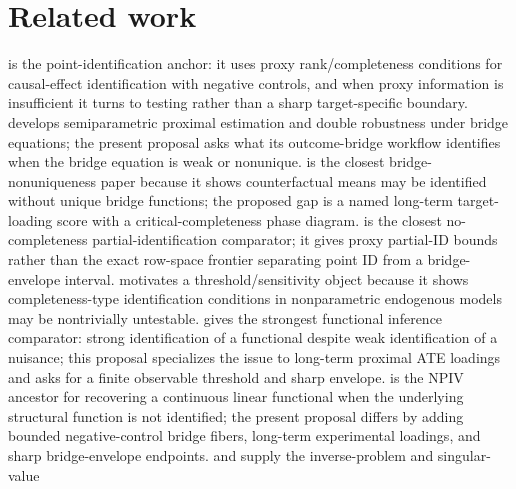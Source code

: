 \documentclass[11pt]{article}
\theoremstyle{definition}
\theoremstyle{plain}
\theoremstyle{remark}
\begin{document}
\section{Related work}
\citet[Sections 2--4, especially the categorical rank result in Section
2 and the nonparametric completeness discussion in Section 3]{MiaoGengTchetgen2018}
is the point-identification anchor: it uses proxy rank/completeness conditions
for causal-effect identification with negative controls, and when proxy
information is insufficient it turns to testing rather than a sharp
target-specific boundary.  \citet[Theorem 3.1 and influence-function equation
(9)]{CuiPuShiMiaoTchetgen2024} develops semiparametric proximal estimation and
double robustness under bridge equations; the present proposal asks what its
outcome-bridge workflow identifies when the bridge equation is weak or
nonunique.  \citet[Section 2, Theorem 2.1, and Section 3's solution-set
construction]{ZhangLiMiaoTchetgen2023} is the closest bridge-nonuniqueness
paper because it shows counterfactual means may be identified without unique
bridge functions; the proposed gap is a named long-term target-loading score
with a critical-completeness phase diagram.  \citet[Abstract and Section
3 bound construction]{GhassamiShpitserTchetgen2023} is the closest
no-completeness partial-identification comparator; it gives proxy partial-ID
bounds rather than the exact row-space frontier separating point ID from a
bridge-envelope interval.  \citet[Theorem 1 and Section 4]{CanaySantosShaikh2013}
motivates a threshold/sensitivity object because it shows completeness-type
identification conditions in nonparametric endogenous models may be
nontrivially untestable.  \citet[Abstract, Theorem 2.1, and Section 4 proximal
example]{BennettKallusMaoNeweySyrgkanisUehara2023} gives the strongest
functional inference comparator: strong identification of a functional despite
weak identification of a nuisance; this proposal specializes the issue to
long-term proximal ATE loadings and asks for a finite observable threshold and
sharp envelope.  \citet[Abstract and Sections 2--3]{Santos2011JoE} is the NPIV
ancestor for recovering a continuous linear functional when the underlying
structural function is not identified; the present proposal differs by adding
bounded negative-control bridge fibers, long-term experimental loadings, and
sharp bridge-envelope endpoints.  \citet[Chapter 77, Sections 1 and 3]{CarrascoFlorensRenault2007}
and \citet[Abstract plus Sections 2--3 on approximation numbers and link
conditions]{ChenReiss2011} supply the inverse-problem and singular-value
\end{document}
